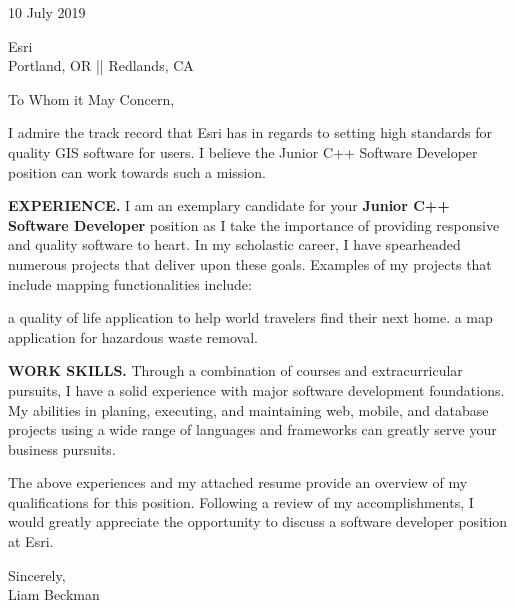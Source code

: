 



\textcolor{my-grey}{\dotfill}
\bigbreak


10 July 2019\\
\bigbreak

Esri\\
Portland, OR || Redlands, CA\\

\bigbreak

To Whom it May Concern,

\bigbreak

I admire the track record that Esri has in regards to setting high standards for quality GIS software for users. I believe the Junior C++ Software Developer position can work towards such a mission.

\bigbreak

\textbf{EXPERIENCE.} I am an exemplary candidate for your \textbf{Junior C++ Software Developer} position as I take the importance of providing responsive and quality software to heart. In my scholastic career, I have spearheaded numerous projects that deliver upon these goals. Examples of my projects that include mapping functionalities include:

\begin{itemize}[label=$\triangleright$]
    a quality of life application to help world travelers find their next home.
    a map application for hazardous waste removal.
\end{itemize}

\bigbreak

\textbf{WORK SKILLS.} Through a combination of courses and extracurricular pursuits, I have a solid experience with major software development foundations. My abilities in planing, executing, and maintaining web, mobile, and database projects using a wide range of languages and frameworks can greatly serve your business pursuits.

\bigbreak

The above experiences and my attached resume provide an overview of my qualifications for this position. Following a review of my accomplishments, I would greatly appreciate the opportunity to discuss a software developer position at Esri.

\bigbreak

Sincerely,\\

Liam Beckman

\vfill

\textcolor{my-grey}{\dotfill}
\medbreak



